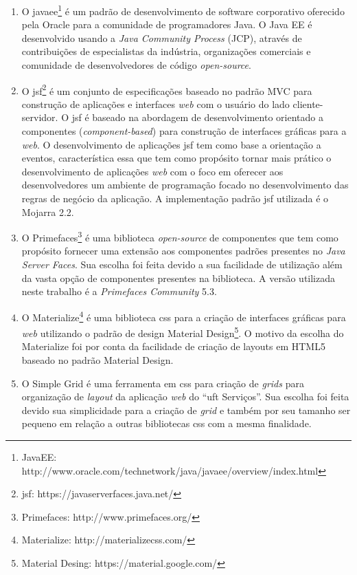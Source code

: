 \begin{enumerate}

    \item O \gls{javaee}\footnote{JavaEE: http://www.oracle.com/technetwork/java/javaee/overview/index.html} é um padrão de desenvolvimento de software corporativo oferecido pela Oracle para a comunidade de programadores Java. O Java EE é desenvolvido usando a \textit{Java Community Process} (JCP), através de contribuições de especialistas da indústria, organizações comerciais e comunidade de desenvolvedores de código \textit{open-source}.
    
    \item O \gls{jsf}\footnote{\acrshort{jsf}: https://javaserverfaces.java.net/} é um conjunto de especificações baseado no padrão MVC para construção de aplicações e interfaces \textit{web} com o usuário do lado cliente-servidor. O \acrshort{jsf} é baseado na abordagem de desenvolvimento orientado a componentes (\textit{component-based}) para construção de interfaces gráficas para a \textit{web}. O desenvolvimento de aplicações \acrshort{jsf} tem como base a orientação a eventos, característica essa que tem como propósito tornar mais prático o desenvolvimento de aplicações \textit{web} com o foco em oferecer aos desenvolvedores um ambiente de programação focado no desenvolvimento das regras de negócio da aplicação. A implementação padrão \acrshort{jsf} utilizada é o Mojarra 2.2.
    
    \item O Primefaces\footnote{Primefaces: http://www.primefaces.org/} é uma biblioteca \textit{open-source} de componentes que tem como propósito fornecer uma extensão aos componentes padrões presentes no \textit{Java Server Faces}.  Sua escolha foi feita devido a sua facilidade de utilização além da vasta opção de componentes presentes na biblioteca. A versão utilizada neste trabalho é a \textit{Primefaces Community} 5.3.
    
    \item O Materialize\footnote{Materialize: http://materializecss.com/} é uma biblioteca  \acrshort{css} para a criação de interfaces gráficas para \textit{web} utilizando o padrão de design Material Design\footnote{Material Desing: https://material.google.com/}. O motivo da escolha do Materialize foi por conta da facilidade de criação de layouts em HTML5 baseado no padrão Material Design.
    
    \item O Simple Grid é uma ferramenta em  \acrshort{css} para criação de \textit{grids} para organização de \textit{layout} da aplicação \textit{web} do ``\acrshort{uft} Serviços''. Sua escolha foi feita devido sua simplicidade para a criação de \textit{grid} e também por seu tamanho ser pequeno em relação a outras bibliotecas  \acrshort{css} com a mesma finalidade.
    

\end{enumerate}
